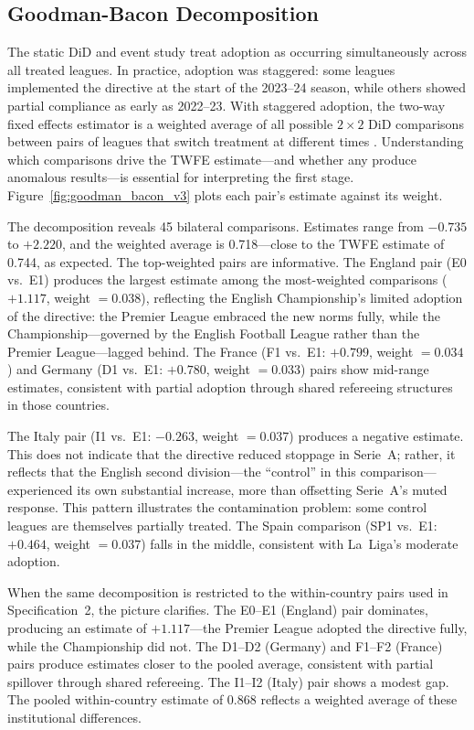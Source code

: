 \subsection{Goodman-Bacon Decomposition}
\label{subsec:goodmanbacon}

The static DiD and event study treat adoption as occurring simultaneously across all treated leagues. In practice, adoption was staggered: some leagues implemented the directive at the start of the 2023--24 season, while others showed partial compliance as early as 2022--23. With staggered adoption, the two-way fixed effects estimator is a weighted average of all possible $2 \times 2$ DiD comparisons between pairs of leagues that switch treatment at different times \citep{goodman2021difference}. Understanding which comparisons drive the TWFE estimate---and whether any produce anomalous results---is essential for interpreting the first stage. Figure~\ref{fig:goodman_bacon_v3} plots each pair's estimate against its weight.

The decomposition reveals 45 bilateral comparisons. Estimates range from $-0.735$ to $+2.220$, and the weighted average is 0.718---close to the TWFE estimate of 0.744, as expected. The top-weighted pairs are informative. The England pair (E0 vs.\ E1) produces the largest estimate among the most-weighted comparisons ($+1.117$, weight $= 0.038$), reflecting the English Championship's limited adoption of the directive: the Premier League embraced the new norms fully, while the Championship---governed by the English Football League rather than the Premier League---lagged behind. The France (F1 vs.\ E1: $+0.799$, weight $= 0.034$) and Germany (D1 vs.\ E1: $+0.780$, weight $= 0.033$) pairs show mid-range estimates, consistent with partial adoption through shared refereeing structures in those countries.

The Italy pair (I1 vs.\ E1: $-0.263$, weight $= 0.037$) produces a negative estimate. This does not indicate that the directive reduced stoppage in Serie~A; rather, it reflects that the English second division---the ``control'' in this comparison---experienced its own substantial increase, more than offsetting Serie~A's muted response. This pattern illustrates the contamination problem: some control leagues are themselves partially treated. The Spain comparison (SP1 vs.\ E1: $+0.464$, weight $= 0.037$) falls in the middle, consistent with La~Liga's moderate adoption.

When the same decomposition is restricted to the within-country pairs used in Specification~2, the picture clarifies. The E0--E1 (England) pair dominates, producing an estimate of $+1.117$---the Premier League adopted the directive fully, while the Championship did not. The D1--D2 (Germany) and F1--F2 (France) pairs produce estimates closer to the pooled average, consistent with partial spillover through shared refereeing. The I1--I2 (Italy) pair shows a modest gap. The pooled within-country estimate of 0.868 reflects a weighted average of these institutional differences.

